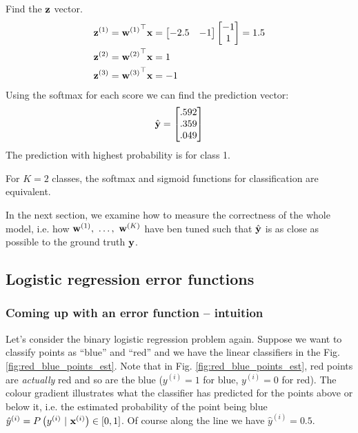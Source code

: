 \documentclass[a4paper]{article}
\begin{document}
\begin{soln}
Find the $\textbf{z}$ vector.
\begin{align*}
\textbf{z}^{(1)} &= {\textbf{w}^{(1)}}^\top \textbf{x} = 
\begin{bmatrix} -2.5 & -1\end{bmatrix}\begin{bmatrix} -1 \\ 1\end{bmatrix} = 1.5 \\
\textbf{z}^{(2)} &= {\textbf{w}^{(2)}}^\top \textbf{x} = 1 \\
\textbf{z}^{(3)} &= {\textbf{w}^{(3)}}^\top \textbf{x} = -1
\end{align*}
Using the softmax for each score we can find the prediction vector:
\[
\hat{\textbf{y}} = \begin{bmatrix}.592 \\ .359 \\ .049 \end{bmatrix}
\]
The prediction with highest probability is for class 1. \qedblack
\end{soln}
\begin{corollary}
For $K=2$ classes, the softmax and sigmoid functions for classification are equivalent.
\end{corollary}
In the next section, we examine how to measure the correctness of the whole model, i.e. how $\bw^{(1)}, \ \ldots, \ \bw^{(K)}$ have ben tuned such that $\hat{\textbf{y}}$ is as close as possible to the ground truth $\textbf{y}$.


\subsection{Logistic regression error functions}

\subsubsection{Coming up with an error function -- intuition}

Let's consider the binary logistic regression problem again. Suppose we want to classify points as ``blue'' and ``red'' and we have the linear classifiers in the Fig. \ref{fig:red_blue_points_est}. Note that in Fig. \ref{fig:red_blue_points_est}, red points are \textit{actually} red and so are the blue ($y^{(i)}=1$ for blue, $y^{(i)}=0$ for red). The colour gradient illustrates what the classifier has predicted for the points above or below it, i.e. the estimated probability of the point being blue $\hat{y}^{(i)} = P\left(y^{(i)}\ | \ \bx^{(i)}\right)  \in [0,1]$. Of course along the line we have $\hat{y}^{(i)}=0.5$.
\end{document}
